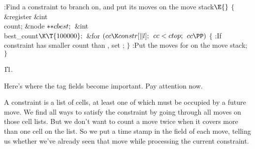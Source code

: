 \B{}:Find a constraint to branch on, and put its moves on the move
stack\X${}\E{}$\6
${}\{{}$\1\6
\&{register} \&{int} \\{count};\6
\&{node} ${}{*}{*}\\{cbest};{}$\6
\&{int} \\{best\_count}${}\K\T{100000};{}$\7
\&{for} ${}(\\{cc}\K\\{constr}[\|l];{}$ ${}\\{cc}<\\{ctop};{}$ ${}\\{cc}\PP){}$%
\5
${}\{{}$\1\6
:If constraint  has smaller count than , set \X;\6
\4${}\}{}$\2\6
:Put the moves for  on the move stack\X;\6
\4${}\}{}$\2\par
\U11.\fi

Here's where the tag fields become important. Pay attention now.

A constraint is a list of cells, at least one of which must be occupied
by a future move. We find all ways to satisfy the constraint by going through
all moves on those cell lists. But we don't want to count a move twice
when it covers more than one cell on the list. So we put a time stamp in the
 field of each move, telling us whether we've already seen that
move
while processing the current constraint.

